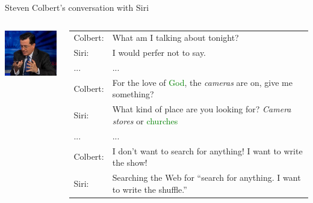 \documentclass[usenames,dvipsnames,11pt,aspectratio=169]{beamer}
\begin{document}
\begin{frame}
    {Steven Colbert's conversation with Siri}
    \begin{columns}
        \begin{column}{0.3\textwidth}
            \includegraphics[width=3cm]{figures/colbert-siri}
        \end{column}
        \begin{column}{0.7\textwidth}
            \begin{tabular}{lp{7cm}}
                Colbert: & What am I talking about tonight? \\
                Siri: & I would perfer not to say. \\
                ... & ...\\
                Colbert: & For the love of \textcolor{Green}{God}, the \emph{cameras} are on, give me something?\\
                Siri: & What kind of place are you looking for? \emph{Camera stores} or \textcolor{Green}{churches} \\
                ... & ...\\
                Colbert: & I don't want to search for anything! I want to write the show!\\
                Siri: & Searching the Web for ``search for anything. I want to write the shuffle.''
            \end{tabular}
        \end{column}
    \end{columns}
\end{frame}
\end{document}
